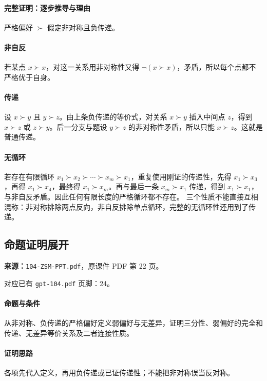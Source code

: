 \paragraph{完整证明：逐步推导与理由}

严格偏好 $\succ$ 假定非对称且负传递。
\paragraph{非自反}若某点 $x\succ x$，对这一关系用非对称性又得 $\neg(x\succ x)$，矛盾，所以每个点都不严格优于自身。
\paragraph{传递}设 $x\succ y$ 且 $y\succ z$。由上条负传递的等价式，对关系 $x\succ y$ 插入中间点 $z$，得到 $x\succ z$ 或 $z\succ y$。后一分支与题设 $y\succ z$ 的非对称性矛盾，所以只能 $x\succ z$。这就是普通传递。
\paragraph{无循环}若存在有限循环 $x_1\succ x_2\succ\cdots\succ x_m\succ x_1$，重复使用刚证的传递性，先得 $x_1\succ x_3$，再得 $x_1\succ x_4$，最终得 $x_1\succ x_m$。再与最后一条 $x_m\succ x_1$ 传递，得到 $x_1\succ x_1$，与非自反矛盾。因此任何有限长度的严格循环都不存在。
三个性质不能直接互相混称：非对称排除两点反向，非自反排除单点循环，完整的无循环性还用到了传递。

\clearpage\subsection{命题证明展开}
\textbf{来源：}\texttt{104-ZSM-PPT.pdf}，原课件 PDF 第 22 页。\par
对应已有 \texttt{gpt-104.pdf} 页脚：24。\par
\paragraph{命题与条件}从非对称、负传递的严格偏好定义弱偏好与无差异，证明三分性、弱偏好的完全和传递、无差异等价关系及二者连接性质。
\paragraph{证明思路}各项先代入定义，再用负传递或已证传递性；不能把非对称误当反对称。
